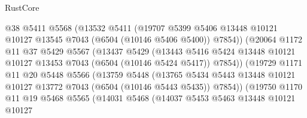 \begin{lexlean}{RustCore}
\begin{coremodule}
                            @38
                            @5411
                            @5568
                            (@13532
                              @5411
                              (@19707
                                @5399
                                @5406
                                @13448
                                @10121
                                @10127
                                @13545
                                @7043
                                (@6504 (@10146 @5406 @5400))
                                @7854))
                            (@20064
                              @1172
                              @11
                              @37
                              @5429
                              @5567
                              (@13437
                                @5429
                                (@13443
                                  @5416
                                  @5424
                                  @13448
                                  @10121
                                  @10127
                                  @13453
                                  @7043
                                  (@6504 (@10146 @5424 @5417))
                                  @7854))
                              (@19729
                                @1171
                                @11
                                @20
                                @5448
                                @5566
                                (@13759
                                  @5448
                                  (@13765
                                    @5434
                                    @5443
                                    @13448
                                    @10121
                                    @10127
                                    @13772
                                    @7043
                                    (@6504 (@10146 @5443 @5435))
                                    @7854))
                                (@19750
                                  @1170
                                  @11
                                  @19
                                  @5468
                                  @5565
                                  (@14031
                                    @5468
                                    (@14037
                                      @5453
                                      @5463
                                      @13448
                                      @10121
                                      @10127

\end{coremodule}
\end{lexlean}
